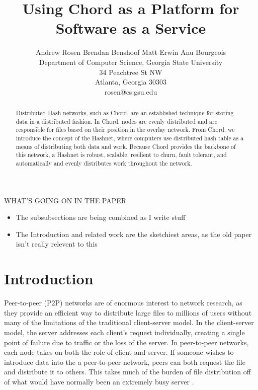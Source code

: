 \documentclass[conference, compsocconf, letterpaper]{IEEEtran}
\title{Using Chord as a Platform for Software as a Service}
\author{
Andrew Rosen \qquad Brendan Benshoof \qquad Matt Erwin \qquad Anu Bourgeois  \\Department of Computer Science, Georgia State University\\ 34 Peachtree St NW \\ Atlanta, Georgia 30303\\  rosen@cs.gsu.edu }
\begin{document}
\maketitle

\begin{abstract}
Distributed Hash networks, such as Chord, are an established technique for storing data in a distributed fashion. In Chord, nodes are evenly distributed and are responsible for files based on their position in the overlay network.  From Chord, we introduce the concept of the Hashnet, where computers use distributed hash table as a means of distributing both data and work.  Because Chord provides the backbone of this network, a Hashnet is robust, scalable, resilient to churn, fault tolerant, and automatically  and evenly distributes work throughout the network.


\end{abstract}

WHAT'S GOING ON IN THE PAPER

\begin{itemize}
    \item The subsubsections are being combined as I write stuff
    \item The Introduction and related work are the sketchiest areas, as the old paper isn't really relevent to this 
\end{itemize}


\section{Introduction}
Peer-to-peer (P2P) networks are of enormous interest to network research, as they provide an efficient way to distribute large files to millions of users without many of the limitations of the traditional client-server model. In the client-server model, the server addresses each client's request individually, creating a single point of failure due to traffic or the loss of the server.  In peer-to-peer networks, each node takes on both the role of client and server.  If someone wishes to introduce data into the a peer-to-peer network, peers can both request the file and distribute it to others.  This takes much of the burden of file distribution off of what would have normally been an extremely busy server \cite{Overview}.  
\end{document}
